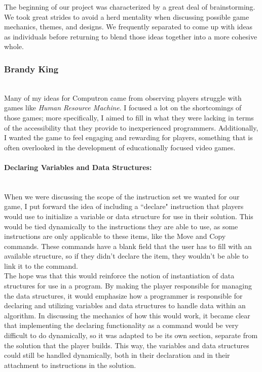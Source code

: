 The beginning of our project was characterized by a great deal of brainstorming. We took great strides
to avoid a herd mentality when discussing possible game mechanics, themes, and designs. We frequently
separated to come up with ideas as individuals before returning to blend those ideas together into a more
cohesive whole.

\subsubsection{Brandy King}\mbox{} \\
Many of my ideas for Computron came from observing players struggle with games like \textit{Human
Resource Machine}. I focused a lot on the shortcomings of those games; more specifically, I aimed to fill in
what they were lacking in terms of the accessibility that they provide to inexperienced programmers.
Additionally, I wanted the game to feel engaging and rewarding for players, something that is often
overlooked in the development of educationally focused video games. \\

\paragraph{Declaring Variables and Data Structures:}\mbox{} \\
When we were discussing the scope of the instruction set we wanted for our game, I put forward the idea
of including a ``declare" instruction that players would use to initialize a variable or data structure for use
in their solution. This would be tied dynamically to the instructions they are able to use, as some instructions
are only applicable to these items, like the Move and Copy commands. These commands have a blank field
that the user has to fill with an available structure, so if they didn't declare the item, they wouldn't be able to
link it to the command.\\

The hope was that this would reinforce the notion of instantiation of data structures for use in a program. By
making the player responsible for managing the data structures, it would emphasize how a programmer
is responsible for declaring and utilizing variables and data structures to handle data within an algorithm. In
discussing the mechanics of how this would work, it became clear that implementing the declaring functionality
as a command would be very difficult to do dynamically, so it was adapted to be its own section, separate from
the solution that the player builds. This way, the variables and data structures could still be handled dynamically,
both in their declaration and in their attachment to instructions in the solution.\\

